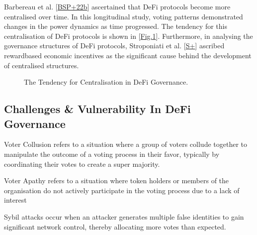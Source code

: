 \documentclass[letterpaper,10pt,english]{jupyterBook}
\let\sphinxpxdimen\pdfpxdimen\else\newdimen\sphinxpxdimen
\begin{document}
\sphinxAtStartPar
Barbereau et al. {[}\hyperlink{cite.GOV/gov:id28}{BSP+22b}{]} ascertained that DeFi protocols become more centralised over time. In this longitudinal study, voting patterns demonstrated changes in the power dynamics as time progressed. The tendency for this centralisation of DeFi protocols is shown in {[}\hyperref[\detokenize{GOV/gov:gov-evolution}]{Fig.\@ \ref{\detokenize{GOV/gov:gov-evolution}}}{]}. Furthermore, in analysing the governance structures of DeFi protocols, Stroponiati et al. {[}\hyperlink{cite.GOV/gov:id27}{S+}{]} ascribed reward\sphinxhyphen{}based economic incentives as the significant cause behind the development of centralised structures.

\begin{figure}[htbp]
\centering
\capstart

\noindent\sphinxincludegraphics[width=750\sphinxpxdimen,height=260\sphinxpxdimen]{{Govern.drawio}.png}
\caption{The Tendency for Centralisation in DeFi Governance.}\label{\detokenize{GOV/gov:gov-evolution}}\end{figure}


\subsection{Challenges \& Vulnerability In DeFi Governance}
\label{\detokenize{GOV/gov:challenges-vulnerability-in-defi-governance}}
\begin{sphinxShadowBox}

\sphinxAtStartPar
Voter Collusion refers to a situation where a group of voters collude together to manipulate the outcome of a voting process in their favor, typically by coordinating their votes to create a super majority.
\end{sphinxShadowBox}

\begin{sphinxShadowBox}

\sphinxAtStartPar
Voter Apathy refers to a situation where token holders or members of the organisation do not actively participate in the voting process due to a lack of interest
\end{sphinxShadowBox}

\begin{sphinxShadowBox}

\sphinxAtStartPar
Sybil attacks occur when an attacker generates multiple false identities to gain significant network control, thereby allocating more votes than expected.
\end{sphinxShadowBox}
\end{document}
